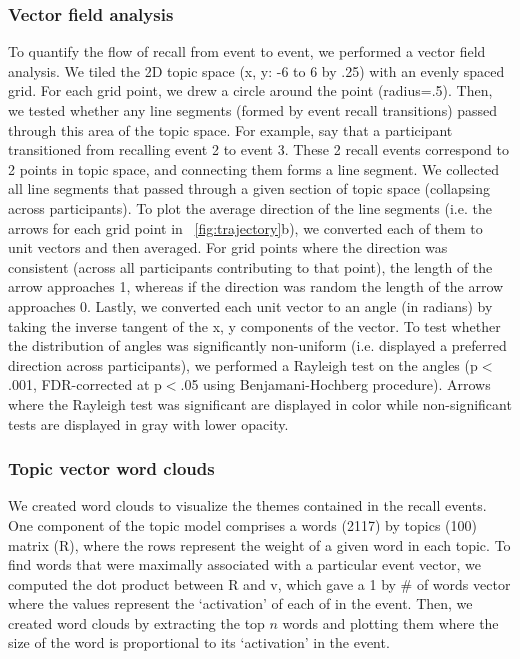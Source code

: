 \documentclass{article}
\begin{document}
{\subsubsection{Vector field analysis}
To quantify the flow of recall from event to event, we performed a vector field analysis.  We tiled the 2D topic space (x, y: -6 to 6 by .25) with an evenly spaced grid. For each grid point, we drew a circle around the point (radius=.5). Then, we tested whether any line segments (formed by event recall transitions) passed through this area of the topic space.  For example, say that a participant transitioned from recalling event 2 to event 3. These 2 recall events correspond to 2 points in topic space, and connecting them forms a line segment. We collected all line segments that passed through a given section of topic space (collapsing across participants). To plot the average direction of the line segments (i.e. the arrows for each grid point in ~\ref{fig:trajectory}b), we converted each of them to unit vectors and then averaged. For grid points where the direction was consistent (across all participants contributing to that point), the length of the arrow approaches 1, whereas if the direction was random the length of the arrow approaches 0. Lastly, we converted each unit vector to an angle (in radians) by taking the inverse tangent of the x, y components of the vector. To test whether the distribution of angles was significantly non-uniform (i.e. displayed a preferred direction across participants), we performed a Rayleigh test on the angles (p$<$.001, FDR-corrected at p$<$.05 using Benjamani-Hochberg procedure). Arrows where the Rayleigh test was significant are displayed in color while non-significant tests are displayed in gray with lower opacity.

\subsubsection{Topic vector word clouds}
We created word clouds to visualize the themes contained in the recall events. One component of the topic model comprises a words (2117) by topics (100) matrix (R), where the rows represent the weight of a given word in each topic.  To find words that were maximally associated with a particular event vector, we computed the dot product between R and v, which gave a 1 by \# of words vector where the values represent the `activation' of each of in the event. Then, we created word clouds by extracting the top $n$ words and plotting them where the size of the word is proportional to its `activation' in the event.

}
\end{document}
